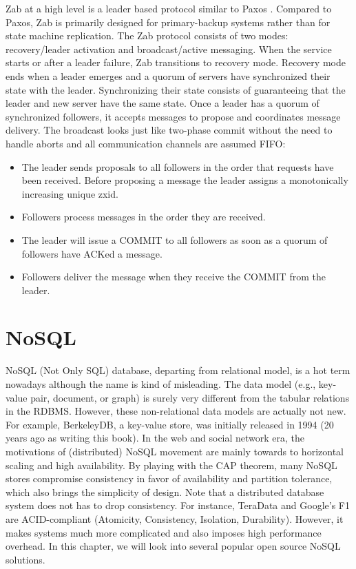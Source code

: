 \documentclass[11pt]{book}
\begin{document}
Zab at a high level is a leader based protocol similar to Paxos \cite{Lamport:1998:PP}. Compared to Paxos, Zab is primarily designed for primary-backup systems rather than for state machine replication.
The Zab protocol consists of two modes: recovery/leader activation and broadcast/active messaging. When the service starts or after a leader failure, Zab transitions to recovery mode. Recovery mode ends when a leader emerges and a quorum of servers have synchronized their state with the leader. Synchronizing their state consists of guaranteeing that the leader and new server have the same state.
Once a leader has a quorum of synchronized followers, it accepts messages to propose and coordinates message delivery. The broadcast looks just like two-phase commit \cite{opac:2009} without the need to handle aborts and all communication channels are assumed FIFO:
\begin{itemize}
\item The leader sends proposals to all followers in the order that requests have been received. Before proposing a message the leader assigns a monotonically increasing unique zxid.
\item Followers process messages in the order they are received.
\item The leader will issue a COMMIT to all followers as soon as a quorum of followers have ACKed a message.
\item Followers deliver the message when they receive the COMMIT from the leader.
\end{itemize}

\chapter[NoSQL]
{NoSQL}
NoSQL (Not Only SQL) database, departing from relational model,  is a hot term nowadays although the name is kind of misleading. The data model (e.g., key-value pair, document, or graph) is surely very different from the tabular relations in the RDBMS. However, these non-relational data models are actually not new. For example, BerkeleyDB, a key-value store, was initially released in 1994 (20 years ago as writing this book). In the web and social network era, the motivations of (distributed) NoSQL movement are mainly towards to horizontal scaling and high availability. By playing with the CAP theorem, many NoSQL stores compromise consistency in favor of availability and partition tolerance, which also brings the simplicity of design. Note that a distributed database system does not has to drop consistency. For instance, TeraData and Google's F1 are ACID-compliant (Atomicity, Consistency, Isolation, Durability). However, it makes systems much more complicated and also imposes high performance overhead. In this chapter, we will look into several popular open source NoSQL solutions.
\end{document}
